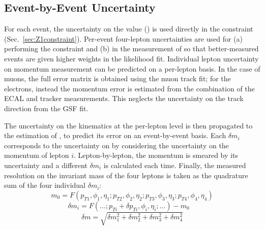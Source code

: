 \subsection{Event-by-Event \mfourl Uncertainty}
\label{sec:ebe}
For each event, the uncertainty on the \mfourl value (\mfourlerr) is used directly in the \Zone constraint (Sec.~\ref{sec:Z1constraint}).
Per-event four-lepton uncertainties are used for (a) performing the \Zone constraint and (b) in the measurement of \mH so that better-measured events are given higher weights in the likelihood fit.
Individual lepton uncertainty on momentum measurement can be predicted on a per-lepton basis.
In the case of muons, the full error matrix is obtained using the muon track fit;
for the electrons, instead the momentum error is estimated from the combination of the ECAL and tracker measurements.
This neglects the uncertainty on the track direction from the GSF fit.

The uncertainty on the kinematics at the per-lepton level is then propagated to the estimation of \mfourl, to predict its error on an event-by-event basis.
Each $\delta m_{i}$ corresponds to the uncertainty on \mfourl by considering the uncertainty on the momentum of lepton $i$.
Lepton-by-lepton, the momentum is smeared by its uncertainty and a different $\delta m_{i}$ is calculated each time.
Finally, the measured resolution on the invariant mass of the four leptons is taken as the quadrature sum of the four individual $\delta m_{i}$:
\[
m_{0} = F\left( p_{T1}, \phi_{1},\eta_{1}; p_{T2}, \phi_{2},\eta_{2}; p_{T3}, \phi_{3}, \eta_{3}; p_{T4}, \phi_{4},\eta_{4} \right)
\]
\[
    \delta m_{i} = F(...; p_{Ti} + \delta p_{Ti}, \phi_{i}, \eta_{i}; ...) - m_{0} \quad
\]
\[
\delta m = \sqrt{\delta m_{1}^2 + \delta m_{2}^2 + \delta m_{3}^2 + \delta m_{4}^2}
\]


